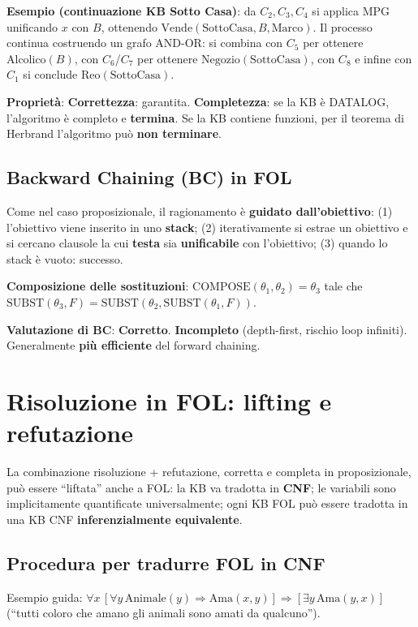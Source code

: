 \documentclass[11pt,a4paper]{report}
\begin{document}
\textbf{Esempio (continuazione KB Sotto Casa)}: da $C_2,C_3,C_4$ si applica MPG unificando $x$ con $B$, ottenendo $\text{Vende}(\text{SottoCasa},B,\text{Marco})$. Il processo continua costruendo un grafo AND-OR: si combina con $C_5$ per ottenere $\text{Alcolico}(B)$, con $C_6$/$C_7$ per ottenere $\text{Negozio}(\text{SottoCasa})$, con $C_8$ e infine con $C_1$ si conclude $\text{Reo}(\text{SottoCasa})$.

\textbf{Proprietà}: \textbf{Correttezza}: garantita. \textbf{Completezza}: se la KB è DATALOG, l'algoritmo è completo e \textbf{termina}. Se la KB contiene funzioni, per il teorema di Herbrand l'algoritmo può \textbf{non terminare}.

\subsection*{Backward Chaining (BC) in FOL}

Come nel caso proposizionale, il ragionamento è \textbf{guidato dall'obiettivo}: (1) l'obiettivo viene inserito in uno \textbf{stack}; (2) iterativamente si estrae un obiettivo e si cercano clausole la cui \textbf{testa} sia \textbf{unificabile} con l'obiettivo; (3) quando lo stack è vuoto: successo.

\textbf{Composizione delle sostituzioni}: $\text{COMPOSE}(\theta_1,\theta_2)=\theta_3$ tale che $\text{SUBST}(\theta_3,F) = \text{SUBST}(\theta_2, \text{SUBST}(\theta_1,F))$.

\textbf{Valutazione di BC}: \textbf{Corretto}. \textbf{Incompleto} (depth-first, rischio loop infiniti). Generalmente \textbf{più efficiente} del forward chaining.

\section{Risoluzione in FOL: lifting e refutazione}

La combinazione risoluzione + refutazione, corretta e completa in proposizionale, può essere ``liftata'' anche a FOL: la KB va tradotta in \textbf{CNF}; le variabili sono implicitamente quantificate universalmente; ogni KB FOL può essere tradotta in una KB CNF \textbf{inferenzialmente equivalente}.

\subsection*{Procedura per tradurre FOL in CNF}

Esempio guida: $\forall x\, [\forall y\, \text{Animale}(y)\Rightarrow\text{Ama}(x,y)] \Rightarrow [\exists y\, \text{Ama}(y,x)]$ (``tutti coloro che amano gli animali sono amati da qualcuno'').
\end{document}
